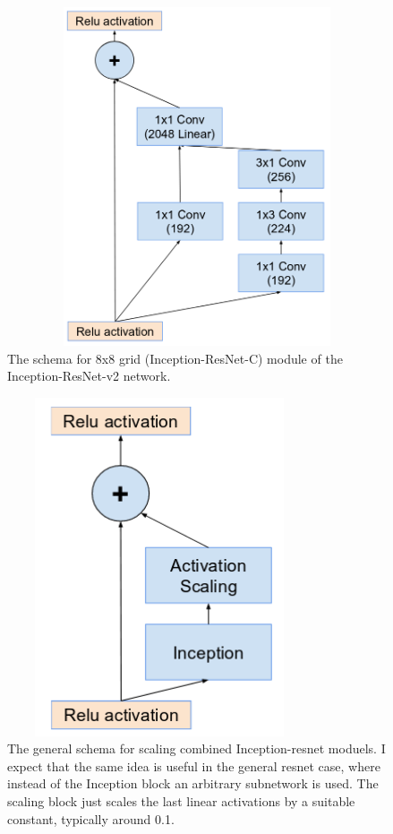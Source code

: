 \documentclass[a4paper,12pt, twoside]{NITKReport}
\begin{document}
\begin{figure}[h]
  \centering
    
    \includegraphics[height=10cm,width=13cm]{figure19.png}
    \caption{The schema for 8x8 grid (Inception-ResNet-C) module of the Inception-ResNet-v2 network.~\cite{szegedy2017inception}}
    \label{19}
  
  \end{figure}
\begin{figure}
\centering
    \includegraphics[height=10cm,width=9cm]{figure20.png}
    \caption{The general schema for scaling combined Inception-resnet moduels. I expect that the same idea is useful in the general resnet case, where instead of the Inception block an arbitrary subnetwork is used.  The scaling block just scales the last linear activations by a suitable constant, typically around 0.1.~\cite{szegedy2017inception}}
    \label{20}
\end{figure}
\end{document}
